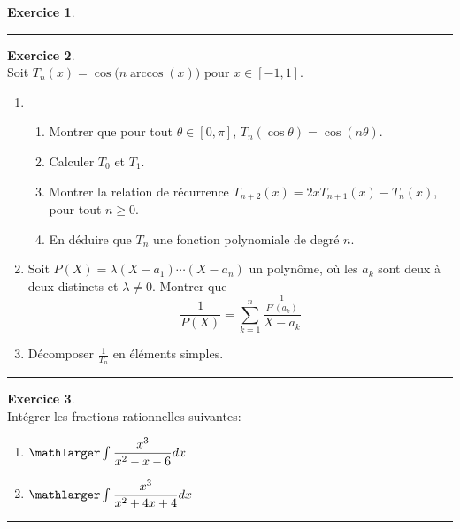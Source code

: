 \documentclass[a4paper,10pt]{article}
\theoremstyle{definition}
\theoremstyle{definition}
\newtheorem{exo}{Exercice}
\begin{document}
\begin{minipage}{1\linewidth}
\begin{minipage}[t]{0.48\linewidth}
\begin{exo}
	\centering
	\rule{1\linewidth}{0.6pt}
\end{exo}

	



		
		
		
	\end{minipage}	
	\hfill\vrule\hfill
	\begin{minipage}[t]{0.48\linewidth}
		\raggedright
		
	\begin{exo}\quad\\
Soit $T_n(x)=\cos\big(n \arccos(x)\big)$ pour $x\in [-1,1]$.
\begin{enumerate}
	\item 
	\begin{enumerate}
		\item Montrer que pour tout $\theta\in[0,\pi]$, $T_n(\cos\theta)=\cos(n\theta)$.
		\item Calculer $T_0$ et $T_1$.
		\item Montrer la relation de récurrence $T_{n+2}(x) = 2xT_{n+1}(x)-T_n(x)$, pour tout $n \ge0$.
		\item En déduire que $T_n$ une fonction polynomiale de degré $n$.
	\end{enumerate}
	
	\item Soit $P(X)=\lambda(X-a_1)\cdots(X-a_n)$ un polynôme, où les $a_k$ sont deux à deux distincts 
	et $\lambda\not=0$. Montrer que 
	$$\frac{1}{P(X)}=\sum_{k=1}^n\frac{\frac{1}{P'(a_k)}}{X-a_k}$$
	
	\item Décomposer $\frac{1}{T_n}$ en éléments simples.
\end{enumerate}
\centering
\rule{1\linewidth}{0.6pt}
\end{exo}			

\begin{exo}\quad\\
	Intégrer les fractions rationnelles suivantes:
	\begin{multicols}{2}
		\begin{enumerate}
			\item $\mathlarger\int_{}^{}\dfrac{x^3}{x^2-x-6}dx$
			\item $\mathlarger\int_{}^{}\dfrac{x^3}{x^2+4x+4}dx$
		\end{enumerate}
	\end{multicols}
	
	\centering
	\rule{1\linewidth}{0.6pt}
\end{exo}
		
	\end{minipage}
\end{minipage}	
\end{document}
